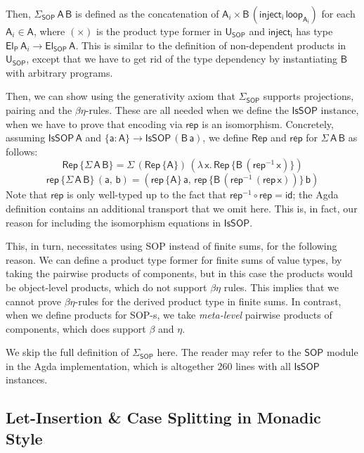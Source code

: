 \documentclass[acmsmall]{acmart}
\newcommand{\mit}[1]{{\mathsf{#1}}}
\newcommand{\msf}[1]{{\mathsf{#1}}}
\newcommand{\lam}{\lambda\,}
\newcommand{\vA}{\mathsf{A}}
\newcommand{\vB}{\mathsf{B}}
\newcommand{\va}{\mathsf{a}}
\newcommand{\vb}{\mathsf{b}}
\newcommand{\vx}{\mathsf{x}}
\newcommand{\SOP}{\msf{SOP}}
\newcommand{\El}{\msf{El}}
\newcommand{\USOP}{\msf{U}_{\msf{SOP}}}
\newcommand{\Elprod}{\msf{El_{P}}}
\newcommand{\IsSOP}{\msf{IsSOP}}
\newcommand{\rep}{\msf{rep}}
\theoremstyle{remark}
\newcommand{\id}{\mit{id}}
\newcommand{\Rep}{\mit{Rep}}
\begin{document}
Then, $\Sigma_\SOP\,\vA\,\vB$ is defined as the concatenation of $\vA_i \times
\vB\,(\msf{inject_i}\,\msf{loop_{\vA_i}})$ for each $\vA_i \in \vA$, where
$({\times})$ is the product type former in $\USOP$ and $\msf{inject_i}$
has type $\Elprod\,\vA_i \to \El_\SOP\,\vA$. This is similar to the definition of
non-dependent products in $\USOP$, except that we have to get rid of the type
dependency by instantiating $\vB$ with arbitrary programs.

Then, we can show using the generativity axiom that $\Sigma_\SOP$ supports
projections, pairing and the $\beta\eta$-rules. These are all needed when we
define the $\IsSOP$ instance, when we have to prove that encoding via $\rep$
is an isomorphism. Concretely, assuming $\IsSOP\,\vA$ and $\{\va : \vA\} \to
\IsSOP\,(\vB\,\va)$, we define $\Rep$ and $\msf{rep}$ for $\Sigma\,\vA\,\vB$ as follows:
\[ \Rep\,\{\Sigma\,\vA\,\vB\} = \Sigma\,(\Rep\,\{\vA\})\,(\lam \vx.\,\Rep\,\{\vB\,(\rep^{-1}\,\vx)\}) \]
\[  \rep\,\{\Sigma\,\vA\,\vB\}\,(\va,\,\vb) = (\rep\,\{\vA\}\,\va,\,\rep\,\{\vB\,(\rep^{-1}\,(\rep\,\vx))\}\,\vb) \]
Note that $\rep$ is only well-typed up to the fact that $\rep^{-1} \circ \rep =
\id$; the Agda definition contains an additional transport that we omit here.
This is, in fact, our reason for including the isomorphism equations in
$\IsSOP$.

This, in turn, necessitates using SOP instead of finite sums, for the following
reason. We can define a product type former for finite sums of value types, by
taking the pairwise products of components, but in this case the products would
be object-level products, which do not support $\beta\eta$ rules. This implies
that we cannot prove $\beta\eta$-rules for the derived product type in finite
sums. In contrast, when we define products for SOP-s, we take \emph{meta-level}
pairwise products of components, which does support $\beta$ and $\eta$.

We skip the full definition of $\Sigma_\SOP$ here. The reader may refer to the
$\SOP$ module in the Agda implementation, which is altogether 260 lines with all
$\IsSOP$ instances.

\subsection{Let-Insertion \& Case Splitting in Monadic Style}
\end{document}
